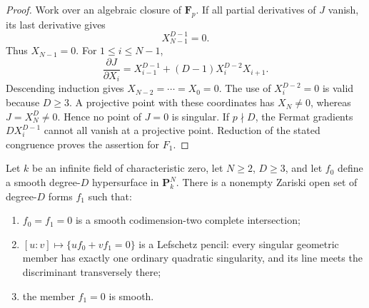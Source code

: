 \begin{proof}
Work over an algebraic closure of $\mathbf F_p$. If all partial
derivatives of $J$ vanish, its last derivative gives
\[
                        X_{N-1}^{D-1}=0.
\]
Thus $X_{N-1}=0$. For $1\le i\le N-1$,
\[
 \frac{\partial J}{\partial X_i}
    =X_{i-1}^{D-1}+(D-1)X_i^{D-2}X_{i+1}.
\]
Descending induction gives $X_{N-2}=\cdots=X_0=0$.
The use of $X_i^{D-2}=0$ is valid because $D\ge3$.
A projective point with these coordinates has $X_N\ne0$,
whereas $J=X_N^D\ne0$. Hence no point of $J=0$ is singular.
If $p\nmid D$, the Fermat gradients $D X_i^{D-1}$ cannot
all vanish at a projective point. Reduction of the stated
congruence proves the assertion for $F_1$.
\end{proof}

\begin{lemma}
\label{r17gp:fixed-member}
Let $k$ be an infinite field of characteristic zero, let
$N\ge2$, $D\ge3$, and let $f_0$ define a smooth degree-$D$
hypersurface in $\mathbf P^N_k$. There is a nonempty Zariski
open set of degree-$D$ forms $f_1$ such that:
\begin{enumerate}
\item $f_0=f_1=0$ is a smooth codimension-two complete intersection;
\item $[u:v]\mapsto\{u f_0+v f_1=0\}$ is a Lefschetz pencil:
      every singular geometric member has exactly one ordinary
      quadratic singularity, and its line meets the discriminant
      transversely there;
\item the member $f_1=0$ is smooth.
\end{enumerate}
\end{lemma}


